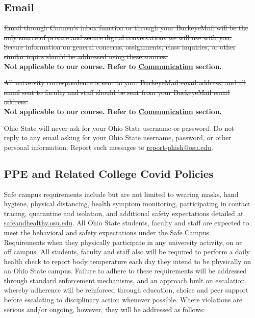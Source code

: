 \subsection{Email}

\sout{Email through Carmen's inbox function or through your BuckeyeMail will be the only source of private and secure digital conversations we will use with you. Secure information on general concerns, assignments, class inquiries, or other similar topics should be addressed using these sources.}\\
\textbf{Not applicable to our course. Refer to \hyperlink{communication}{Communication} section.}

\sout{All university correspondence is sent to your BuckeyeMail email address, and all email sent to faculty and staff should be sent from your BuckeyeMail email address.}\\
\textbf{Not applicable to our course. Refer to \hyperlink{communication}{Communication} section.}

Ohio State will never ask for your Ohio State username or password. Do not reply to any email asking for your Ohio State username, password, or other personal information. Report such messages to \href{about:blank}{report-phish@osu.edu}.

\subsection{PPE and Related College Covid Policies}

Safe campus requirements include but are not limited to wearing masks, hand hygiene, physical distancing, health symptom monitoring, participating in contact tracing, quarantine and isolation, and additional safety expectations detailed at \href{safeandhealthy.osu.edu}{safeandhealthy.osu.edu}. All Ohio State students, faculty and staff are expected to meet the behavioral and safety expectations under the Safe Campus Requirements when they physically participate in any university activity, on or off campus. All students, faculty and staff also will be required to perform a daily health check to report body temperature each day they intend to be physically on an Ohio State campus. Failure to adhere to these requirements will be addressed through standard enforcement mechanisms, and an approach built on escalation, whereby adherence will be reinforced through education, choice and peer support before escalating to disciplinary action whenever possible. Where violations are serious and/or ongoing, however, they will be addressed as follows:

